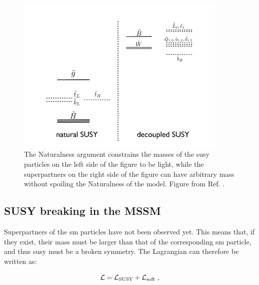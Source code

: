 \begin{figure}[h!]
\begin{center} 
\includegraphics[width=0.9\textwidth]{figures/theory/NaturalSpec.pdf} 
\end{center}
\caption{The Naturalness argument constrains the masses of the \gls{susy} particles on the left side of the figure to be light, while the superpartners on the right side of the figure can have arbitrary mass without spoiling the Naturalness of the model. Figure from Ref. \cite{Papucci:2011wy}.}
\label{fig:NaturalSpectrum}
\end{figure}


\subsection{SUSY breaking in the MSSM}

Superpartners of the \gls{sm} particles have not been observed yet. This means that, if they exist, their mass must be larger than that of the corresponding \gls{sm} particle, and thus \gls{susy} must be a broken symmetry. The Lagrangian can therefore be written as:

\begin{equation}
\mathcal{L} = \mathcal{L}_{\rm SUSY} + \mathcal{L}_{\rm soft} \; ,
\end{equation}

